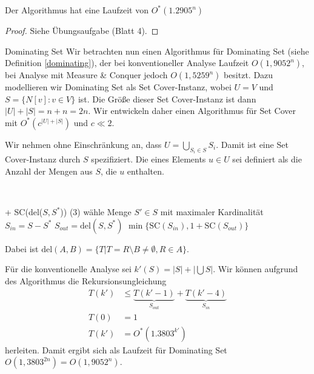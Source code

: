   \begin{lemma}
   Der Algorithmus hat eine Laufzeit von $O^*(1.2905^n)$
  \end{lemma}
  \begin{proof}
   Siehe Übungsaufgabe (Blatt 4).
  \end{proof}
  
\begin{section}{Dominating Set}
  Wir betrachten nun einen Algorithmus für Dominating Set (siehe Definition \ref{dominating}), der bei konventioneller Analyse Laufzeit \(O(1{,}9052^n)\), bei Analyse mit Measure \& Conquer jedoch \(O(1{,}5259^n)\) besitzt. Dazu modellieren wir Dominating Set als Set Cover-Instanz, wobei \(U = V\) und \(S = \{ N[v] : v \in V \}\) ist. Die Größe dieser Set Cover-Instanz ist dann \(|U| + |S| = n + n = 2n\). Wir entwickeln daher einen Algorithmus für Set Cover mit \(O^*(c^{|U|+|S|})\) und \(c \ll 2\).

  Wir nehmen ohne Einschränkung an, dass \(U = \bigcup_{S_i \in S} S_i\). Damit ist eine Set Cover-Instanz durch \(S\) spezifiziert. Die  eines Elements \(u \in U\) sei definiert als die Anzahl der Mengen aus \(S\), die \(u\) enthalten.

  \begin{algorithm}[H]
    \caption{Algorithmus für Set Cover}

     \\
    \KwResult{}

     {
       + SC(del(\(S, S^*\))) (3)
    }
    wähle Menge \(S' \in S\) mit maximaler Kardinalität \\
     {
      \(S_{in} = S - S^*\)\;
      \(S_{out} = \text{del}(S, S^*)\)\;
      \Return \(\min\{ \text{SC}(S_{in}), 1 + \text{SC}(S_{out}) \}\)
    }
  \end{algorithm}

  Dabei ist \(\text{del}(A,B) = \{ T | T = R \setminus B \neq \emptyset, R \in A \}\).

  Für die konventionelle Analyse sei \(k'(S) = |S| + |\bigcup S |\). Wir können aufgrund des Algorithmus die Rekursionsungleichung
  \begin{align*}
   T(k') & \leq \underbrace{T(k' - 1)}_{S_{out}} + \underbrace{T(k' - 4)}_{S_{in}} \\
   T(0) & = 1\\
   T(k') & = O^*(1.3803^{k'})
  \end{align*}
  herleiten. Damit ergibt sich als Laufzeit für Dominating Set \(O(1{,}3803^{2n}) = O(1{,}9052^n)\).


\end{section}
